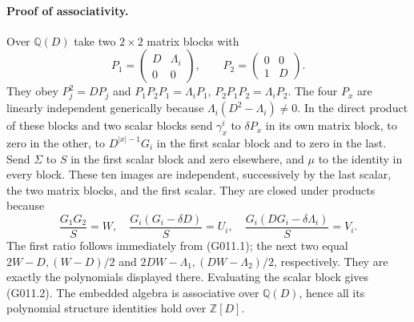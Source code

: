 \paragraph{Proof of associativity.}
Over $\mathbb Q(D)$ take two $2\times2$ matrix blocks with
\[
 P_1=\begin{pmatrix}D&\Lambda_i\\0&0\end{pmatrix},\qquad
 P_2=\begin{pmatrix}0&0\\1&D\end{pmatrix}.
\]
They obey $P_j^2=DP_j$ and $P_1P_2P_1=\Lambda_iP_1$,
$P_2P_1P_2=\Lambda_iP_2$. The four $P_x$ are linearly
independent generically because
$\Lambda_i(D^2-\Lambda_i)\ne0$. In the direct product of
these blocks and two scalar blocks send $\gamma_x^i$ to
$\delta P_x$ in its own matrix block, to zero in the other,
to $D^{|x|-1}G_i$ in the first scalar block and to zero in
the last. Send $\Sigma$ to $S$ in the first scalar block
and zero elsewhere, and $\mu$ to the identity in every
block. These ten images are independent, successively by
the last scalar, the two matrix blocks, and the first scalar.
They are closed under products because
\[
 \frac{G_1G_2}{S}=W,\quad
 \frac{G_i(G_i-\delta D)}S=U_i,\quad
 \frac{G_i(DG_i-\delta\Lambda_i)}S=V_i.
\]
The first ratio follows immediately from (G011.1); the next
two equal $2W-D,(W-D)/2$ and
$2DW-\Lambda_1,(DW-\Lambda_2)/2$, respectively.
They are exactly the polynomials displayed there. Evaluating
the scalar block gives (G011.2). The embedded algebra is
associative over $\mathbb Q(D)$, hence all its polynomial
structure identities hold over $\mathbb Z[D]$.

